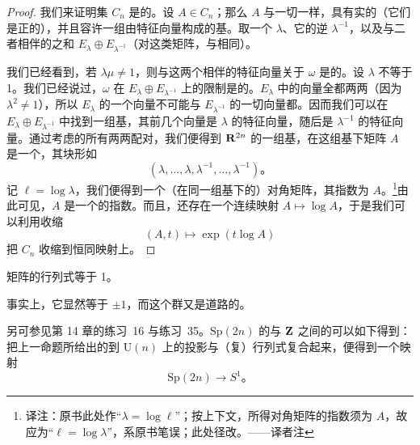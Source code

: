 \begin{proof}
我们来证明\trOpen{}集 $C_n$ 是\trContractible{}的。设 $A\in C_n$；那么 $A$ 与一切\trSymmetricMatrix{}一样，具有实的\trEigenvalue（它们是正的），并且容许一组由特征向量构成的基。取一个\trEigenvalue{} $\lambda$、它的逆 $\lambda^{-1}$，以及与二者相伴的\trEigenspace{}之和 $E_\lambda\oplus E_{\lambda^{-1}}$（对这类\trDiagonalizable{}矩阵，\trEigenspace{}与\trGeneralizedEigenspace{}相同）。

我们已经看到，若 $\lambda\mu\neq1$，则与这两个\trEigenvalue{}相伴的特征向量关于 $\omega$ 是\trOrthogonal{}的。设 $\lambda$ 不等于 1。我们已经说过，$\omega$ 在 $E_\lambda\oplus E_{\lambda^{-1}}$ 上的限制是\trNondegenerate{}的。$E_\lambda$ 中的向量全都两两\trOrthogonal（因为 $\lambda^2\neq1$），所以 $E_\lambda$ 的一个向量不可能与 $E_{\lambda^{-1}}$ 的一切向量都\trOrthogonal。因而我们可以在 $E_\lambda\oplus E_{\lambda^{-1}}$ 中找到一组\trSymplectic{}基，其前几个向量是 $\lambda$ 的特征向量，随后是 $\lambda^{-1}$ 的特征向量。通过考虑\trEigenvalue{}的所有两两配对，我们便得到 $\mathbf{R}^{2n}$ 的一组\trSymplectic{}基，在这组基下矩阵 $A$ 是一个\trBlockDiagonalMatrix，其块形如
\[
(\lambda,\dotsc,\lambda,\lambda^{-1},\dotsc,\lambda^{-1})\text{。}
\]
记 $\ell=\log\lambda$，我们便得到一个（在同一组\trSymplectic{}基下的）对角矩阵，其指数为 $A$。\footnote{译注：原书此处作“$\lambda=\log\ell$”；按上下文，所得对角矩阵的指数须为 $A$，故应为“$\ell=\log\lambda$”，系原书笔误；此处径改。——译者注}由此可见，$A$ 是一个\trDiagonalizable\trSymmetricMatrix{}的指数。而且，还存在一个连续映射 $A\mapsto\log A$，于是我们可以利用收缩
\[
(A,t)\longmapsto\exp(t\log A)
\]
把 $C_n$ 收缩到恒同映射上。
\end{proof}

\begin{corollary}\label{thm:sp-determinant-one}
\trSymplectic{}矩阵的行列式等于 1。
\end{corollary}

事实上，它显然等于 $\pm1$，而这个群又是道路\trConnected{}的。\noqed

另可参见第 14 章的练习~16 与练习~35。$\mathrm{Sp}(2n)$ 的\trFundamentalGroup{}与 $\mathbf{Z}$ 之间的\trIsomorphism{}可以如下得到：把上一命题所给出的到 $\mathrm{U}(n)$ 上的投影与（复）行列式复合起来，便得到一个映射
\[
\mathrm{Sp}(2n)\longrightarrow S^1\text{。}
\]
